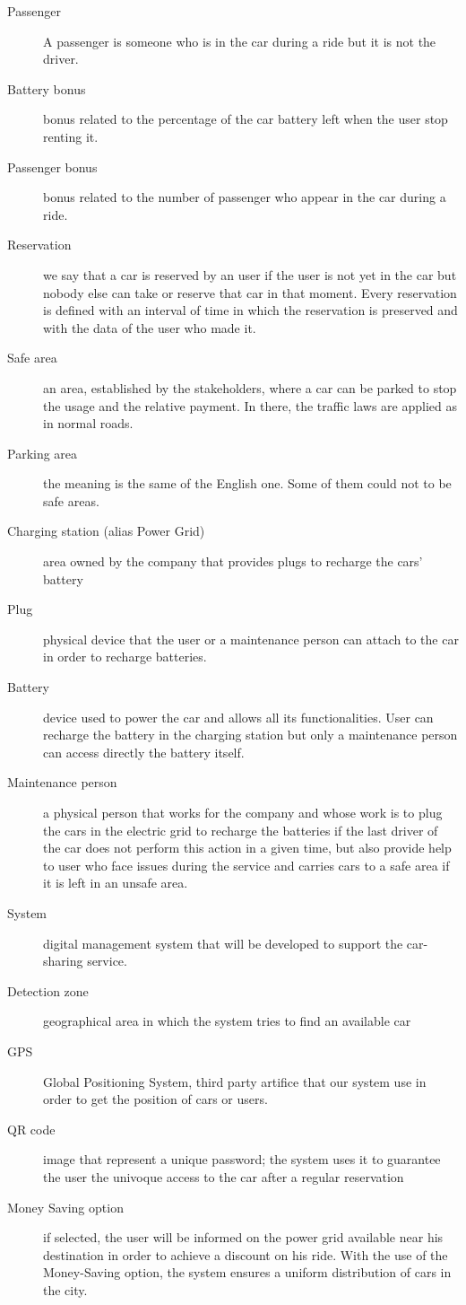 \documentclass[10pt, a4paper,titlepage]{article}
\begin{document}
\begin{description}
\item [Passenger] A passenger is someone who is in the car during a ride but it is not the driver.
\item [Battery bonus] bonus related to the percentage of the car battery left when the user stop renting it.
\item [Passenger bonus] bonus related to the number of passenger who appear in the car during a ride.
\item [Reservation] we say that a car is reserved by an user if the user is not yet in the car but nobody else can take or reserve that car in that moment. Every reservation is defined with an interval of time in which the reservation is preserved and with the data of the user who made it.
\item [Safe area] an area, established by the stakeholders, where a car can be parked to stop the usage and the relative payment. In there, the traffic laws are applied as in normal roads.
\item [Parking area] the meaning is the same of the English one. Some of them could not to be safe areas.
\item [Charging station (alias Power Grid)] area owned by the company that provides plugs to recharge the cars' battery
\item [Plug] physical device that the user or a maintenance person can attach to the car in order to recharge batteries.
\item [Battery] device used to power the car and allows all its functionalities. User can recharge the battery in the charging station but only a maintenance person can access directly the battery itself.
\item [Maintenance person] a physical person that works for the company and whose work is to plug the cars in the electric grid to recharge the batteries if the last driver of the car does not perform this action in a given time, but also provide help to user who face issues during the service and carries cars to a safe area if it is left in an unsafe area.
\item [System] digital management system that will be developed to support the car-sharing service.
\item [Detection zone] geographical area in which the system tries to find an available car
\item [GPS] Global Positioning System, third party artifice that our system use in order to get the position of cars or users.
\item [QR code] image that represent a unique password; the system uses it to guarantee the user the univoque access to the car after a regular reservation
\item [Money Saving option] if selected, the user will be informed on the power grid available near his destination in order to achieve a discount on his ride. With the use of the Money-Saving option, the system ensures a uniform distribution of cars in the city.
\end{description}
\end{document}
